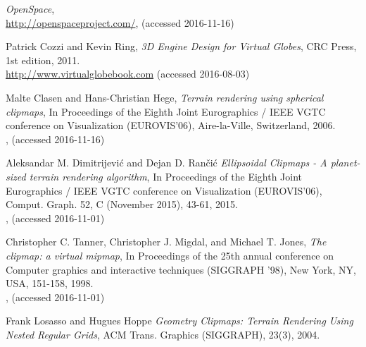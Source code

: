 \cleardoublepage
{}
{}
\begin{thebibliography}{99}



  \emph{OpenSpace},
  \\
  \url{http://openspaceproject.com/},
  (accessed 2016-11-16)

  Patrick Cozzi and Kevin Ring,
  \emph{3D Engine Design for Virtual Globes},
  CRC Press,
  1st edition,
  2011. \\
  \url{http://www.virtualglobebook.com}
  (accessed 2016-08-03)

  Malte Clasen and Hans-Christian Hege,
  \emph{Terrain rendering using spherical clipmaps},
  In Proceedings of the Eighth Joint Eurographics / IEEE VGTC conference on Visualization (EUROVIS'06),
  Aire-la-Ville, Switzerland,
  2006. \\
  ,
  (accessed 2016-11-16)

  Aleksandar M. Dimitrijevi\'{c} and Dejan D. Ran\v{c}i\'{c}
  \emph{Ellipsoidal Clipmaps - A planet-sized terrain rendering algorithm},
  In Proceedings of the Eighth Joint Eurographics / IEEE VGTC conference on Visualization (EUROVIS'06),
  Comput. Graph. 52, C (November 2015), 43-61,
  2015. \\
  ,
  (accessed 2016-11-01)

  Christopher C. Tanner, Christopher J. Migdal, and Michael T. Jones,
  \emph{The clipmap: a virtual mipmap},
  In Proceedings of the 25th annual conference on Computer graphics and interactive techniques (SIGGRAPH '98),
  New York, NY, USA, 151-158,
  1998. \\
  ,
  (accessed 2016-11-01)

  Frank Losasso and Hugues Hoppe
  \emph{Geometry Clipmaps: Terrain Rendering Using Nested Regular Grids},
  ACM Trans. Graphics (SIGGRAPH), 23(3),
  2004.
  

\end{thebibliography}
